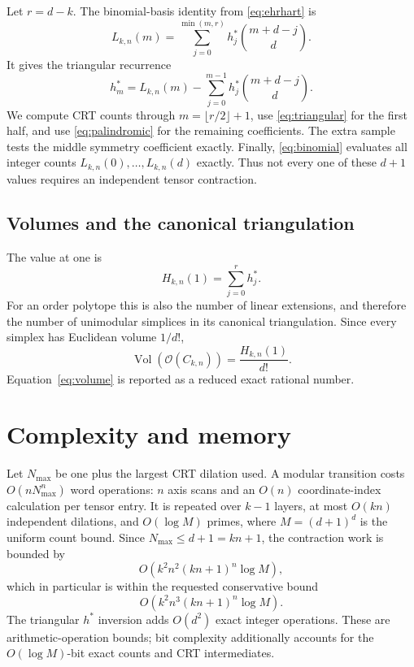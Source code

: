 \documentclass[11pt]{article}
\newcommand{\Ocal}{\mathcal{O}}
\newcommand{\Vol}{\operatorname{Vol}}
\begin{document}
Let $r=d-k$.  The binomial-basis identity from
\eqref{eq:ehrhart} is
\begin{equation}
  L_{k,n}(m)=\sum_{j=0}^{\min(m,r)}
    h_j^*\binom{m+d-j}{d}.
  \label{eq:binomial}
\end{equation}
It gives the triangular recurrence
\begin{equation}
  h_m^*=L_{k,n}(m)-
  \sum_{j=0}^{m-1}h_j^*\binom{m+d-j}{d}.
  \label{eq:triangular}
\end{equation}
We compute CRT counts through
$m=\lfloor r/2\rfloor+1$, use \eqref{eq:triangular} for the first half, and
use \eqref{eq:palindromic} for the remaining coefficients.  The extra
sample tests the middle symmetry coefficient exactly.  Finally,
\eqref{eq:binomial} evaluates all integer counts $L_{k,n}(0),\ldots,
L_{k,n}(d)$ exactly.  Thus not every one of these $d+1$ values requires an
independent tensor contraction.

\subsection{Volumes and the canonical triangulation}

The value at one is
\[
  H_{k,n}(1)=\sum_{j=0}^{r}h_j^*.
\]
For an order polytope this is also the number of linear extensions, and
therefore the number of unimodular simplices in its canonical
triangulation.  Since every simplex has Euclidean volume $1/d!$,
\begin{equation}
  \Vol(\Ocal(C_{k,n}))=\frac{H_{k,n}(1)}{d!}.
  \label{eq:volume}
\end{equation}
Equation~\eqref{eq:volume} is reported as a reduced exact rational number.

\section{Complexity and memory}

Let $N_{\max}$ be one plus the largest CRT dilation used.  A modular
transition costs $O(nN_{\max}^n)$ word operations: $n$ axis scans and an
$O(n)$ coordinate-index calculation per tensor entry.  It is repeated over
$k-1$ layers, at most $O(kn)$ independent dilations, and
$O(\log M)$ primes, where $M=(d+1)^d$ is the uniform count bound.  Since
$N_{\max}\leq d+1=kn+1$, the contraction work is bounded by
\[
  O\!\left(k^2n^2(kn+1)^n\log M\right),
\]
which in particular is within the requested conservative bound
\begin{equation}
  O\!\left(k^2n^3(kn+1)^n\log M\right).
  \label{eq:complexity}
\end{equation}
The triangular $h^*$ inversion adds $O(d^2)$ exact integer operations.
These are arithmetic-operation bounds; bit complexity additionally
accounts for the $O(\log M)$-bit exact counts and CRT intermediates.
\end{document}
